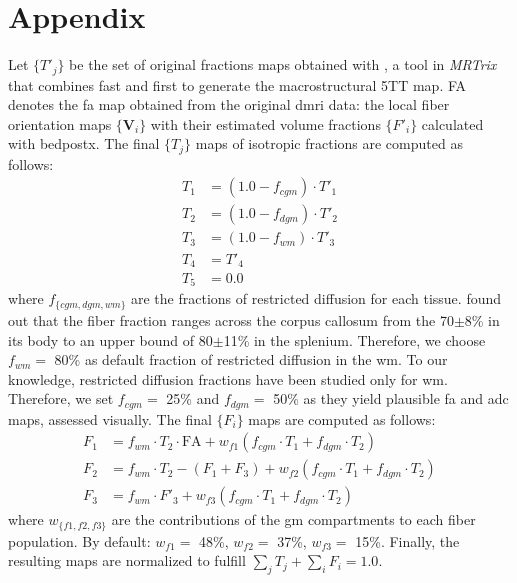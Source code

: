 \documentclass{frontiers/frontiers_suppmat} %
\def\firstAuthorLast{Esteban {et~al.}} %
\def\Authors{Oscar Esteban*, Emmanuel Caruyer, Alessandro Daducci, Meritxell Bach-Cuadra,%
Mar\'ia-J. Ledesma-Carbayo and Andres Santos}
\begin{document}
\onecolumn
{}

\title[Supplementary Material]{} %

\author[\firstAuthorLast ]{\Authors} %
\correspondance{} %

\extraAuth{}%

\maketitle

\section*{Appendix}\label{sec:appendix}
Let $\{T'_j\}$ be the set of original fractions maps obtained with , a
  tool in \emph{MRTrix} that combines \gls*{fast} and \gls*{first}
  to generate the macrostructural 5TT map.
FA denotes the \gls*{fa} map obtained from the original \gls*{dmri} data: the local fiber orientation maps
  $\{\mathbf{V}_i\}$ with their estimated volume fractions $\{F'_i\}$ calculated with \gls*{bedpostx}.
The final $\{T_j\}$ maps of isotropic fractions are computed as follows:
  \begin{align*}
  T_1 &= (1.0-f_{cgm}) \cdot T'_1 \\
  T_2 &= (1.0-f_{dgm}) \cdot T'_2 \\
  T_3 &= (1.0-f_{wm}) \cdot T'_3 \\
  T_4 &= T'_4 \\
  T_5 &= 0.0
  \end{align*}
where $f_{\{cgm, dgm, wm\}}$ are the fractions of restricted diffusion for each tissue.
\cite{sepehrband_brain_2015} found out that the fiber fraction ranges across the corpus
  callosum from the 70$\pm$8\% in its body to an upper bound of 80$\pm$11\% in the splenium.
Therefore, we choose $f_{wm} =$ 80\% as default fraction of restricted diffusion in the
  \gls*{wm}.
To our knowledge, restricted diffusion fractions have been studied only for \gls*{wm}.
Therefore, we set $f_{cgm} =$ 25\% and $f_{dgm} =$ 50\% as they yield plausible \gls*{fa}
  and \gls*{adc} maps, assessed visually.
The final $\{F_i\}$ maps are computed as follows:
\begin{align*}
F_1 &= f_{wm} \cdot T_2 \cdot \text{FA} + w_{f1} (f_{cgm} \cdot T_1 + f_{dgm} \cdot T_2) \\
F_2 &= f_{wm} \cdot T_2 - (F_1 + F_3) + w_{f2} (f_{cgm} \cdot T_1 + f_{dgm} \cdot T_2) \\
F_3 &= f_{wm} \cdot F'_3 + w_{f3} (f_{cgm} \cdot T_1 + f_{dgm} \cdot T_2)
\end{align*}
where $w_{\{f1, f2, f3\}}$ are the contributions of the \gls*{gm} compartments to each fiber population.
By default: $w_{f1} = $ 48\%, $w_{f2} = $ 37\%, $w_{f3} = $ 15\%.
Finally, the resulting maps are normalized to fulfill $\sum_j T_j + \sum_i F_i = 1.0$.

\newpage


\end{document}
